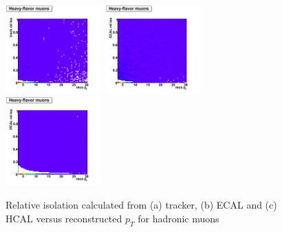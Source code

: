  \begin{figure}[htbp]
    \includegraphics[width = 0.33\textwidth]{pictures/recoPt_relIso/trackIso_muon_nonPrompt.png}
    \includegraphics[width = 0.33\textwidth]{pictures/recoPt_relIso/ecalIso_muon_nonPrompt.png}
    \includegraphics[width = 0.33\textwidth]{pictures/recoPt_relIso/hcalIso_muon_nonPrompt.png}
    \caption{Relative isolation calculated from (a) tracker, (b) ECAL and (c) HCAL versus
       reconstructed $p_{T}$ for hadronic muons}
    \label{fig:NonPromptMuonRecoPt_RelIso}
 \end{figure}

 \clearpage

